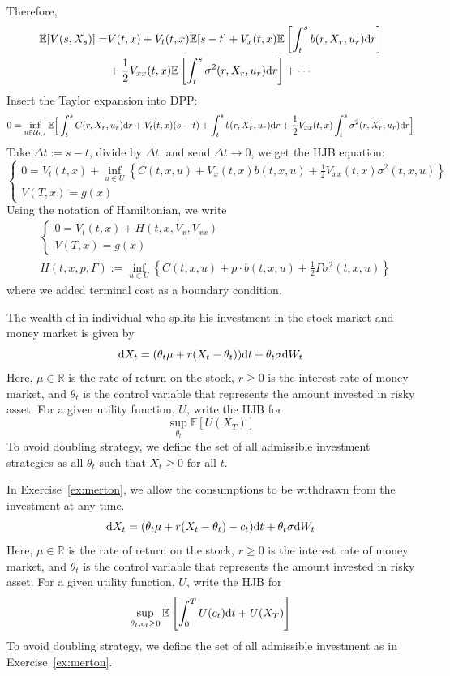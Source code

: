 \documentclass[11pt]{book}
\newcommand{\dd}{\text{\normalfont d}}
\newcommand{\dt}{\text{\normalfont d}t}
\newcommand{\dr}{\text{\normalfont d}r}
\newcommand{\dW}{\text{\normalfont d}W}
\begin{document}
Therefore,
\[
\begin{split}
    \mathbb{E}[V(s,X_s)]  = & V(t,x) + V_t(t,x)\mathbb{E}[s-t]+V_x(t,x)\mathbb{E}\left[\int_t^s  b(r,X_r,u_r)\dr\right] \\
     &+ \frac12 V_{xx}(t,x)\mathbb{E}\left[\int_t^s  \sigma^2(r,X_r,u_r)\dr\right] + \cdots
\end{split}
\]
Insert the Taylor expansion into DPP:
\[
\begin{split}
    0= \inf_{u\in\mathcal{U}_{t,s}}\mathbb{E}\Big[\int_t^s  C(r,X_r,u_r){\dr} + V_t(t,x)(s-t) +\int_t^s  b(r,X_r,u_r)\dr+\frac12 V_{xx}(t,x)\int_t^s  \sigma^2(r,X_r,u_r)\dr\Big]
\end{split}
\]
Take $\Delta t:=s-t$, divide by $\Delta t$, and send $\Delta t\to 0$, we get the HJB equation:
\[
    \begin{cases}
    0= V_t(t,x) + \inf_{u\in U}\left\{ C(t,x,u)  + V_x(t,x) b(t,x,u)+\frac12 V_{xx}(t,x) \sigma^2(t,x,u)\right\}\\
    V(T,x)=g(x)
\end{cases}
\]
Using the notation of Hamiltonian, we write
\begin{align}
     &\begin{cases}
    0= V_t(t,x) + H(t,x,V_x,V_{xx})\\
    V(T,x)=g(x)
\end{cases}\label{eqn:HJB}\\
&\hspace{0cm}H(t,x,p,\Gamma):=\inf_{u\in U}\left\{ C(t,x,u)  + p\cdot b(t,x,u)+\frac12 \Gamma \sigma^2(t,x,u)\right\}\label{eqn:Hamilton_1d}
\end{align}
where we added terminal cost as a boundary condition.
\begin{ex}\label{ex:merton}
    The wealth of in individual who splits his investment in the stock market and money market is given by
    \[
    \dd X_t = (\theta_t \mu + r(X_t-\theta_t))\dt + \theta_t \sigma \dW_t
    \]
    Here, $\mu\in\mathbb{R}$ is the rate of return on the stock, $r\ge0$ is the interest rate of money market,  and $\theta_t$ is the control variable that represents the amount invested in risky asset. 
    For a given utility function, $U$, write the HJB for 
    \[
    \sup_{\theta_t}\mathbb{E}[U(X_T)]
    \]
    To avoid doubling strategy, we define the set of all admissible investment strategies as all $\theta_t$ such that $X_t\ge0$ for all $t$.
\end{ex}
\begin{ex}\label{ex:merton_w_consumption}
    In Exercise~\ref{ex:merton}, we allow the consumptions to be withdrawn from the investment at any time.
    \[
    \dd X_t = (\theta_t \mu + r(X_t-\theta_t)-c_t)\dt + \theta_t \sigma \dW_t
    \]
    Here, $\mu\in\mathbb{R}$ is the rate of return on the stock, $r\ge0$ is the interest rate of money market,  and $\theta_t$ is the control variable that represents the amount invested in risky asset. 
    For a given utility function, $U$, write the HJB for 
    \[
    \sup_{\theta_t,c_t\ge0}\mathbb{E}\left[\int_0^TU(c_t)\dt + U(X_T)\right]
    \]
    To avoid doubling strategy, we define the set of all admissible investment as in Exercise~\ref{ex:merton}.
\end{ex}
\end{document}
